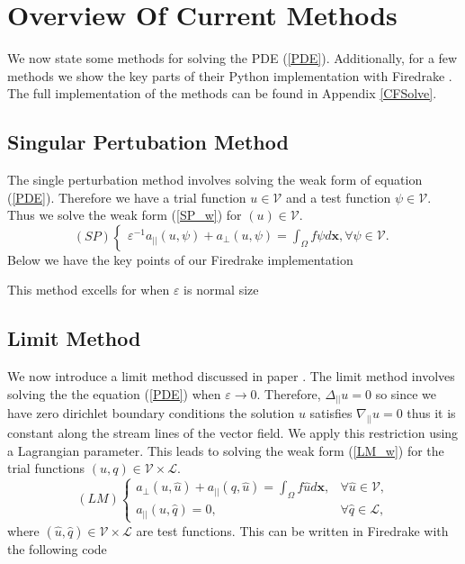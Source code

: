 \documentclass[12pt]{ociamthesis}
\begin{document}
\section{Overview Of Current Methods}
 We now state some methods for solving the PDE (\ref{PDE}). Additionally, for a few methods we show the key parts of their Python implementation with Firedrake \cite{Dragon}. The full implementation of the methods can be found in Appendix \ref{CFSolve}.
\subsection{Singular Pertubation Method} \label{SP}
The single perturbation method involves solving the weak form of equation (\ref{PDE}). Therefore we have a trial function $u \in \mathcal{V}$ and a test function $\psi \in \mathcal{V}$. Thus we solve the weak form (\ref{SP_w}) for $(u) \in \mathcal{V}$.
\begin{equation} \label{SP_w}
(SP)
\begin{cases}
\varepsilon^{-1}a_{||}(u, \psi) + a_{\perp}(u, \psi) = \int_{\Omega} f \psi d\mathbf{x}, \forall \psi \in \mathcal{V}.
\end{cases}
\end{equation}
Below we have the key points of our Firedrake \cite{Dragon} implementation

This method excells for when $\varepsilon$ is normal size

\subsection{Limit Method} \label{LM}
We now introduce a limit method discussed in paper \cite{AP}. The limit method involves solving the the equation (\ref{PDE}) when $\varepsilon \rightarrow 0$. Therefore, $\Delta_{||}u=0$ so since we have zero dirichlet boundary conditions the solution $u$ satisfies $\nabla_{||}u=0$ thus it is constant along the stream lines of the vector field. We apply this restriction using a Lagrangian parameter. This leads to solving the weak form (\ref{LM_w}) for the trial functions $(u, q) \in \mathcal{V} \times \mathcal{L}$.
\begin{equation} \label{LM_w}
(LM)
\begin{cases}
a_{\perp}(u, \hat{u}) + a_{||}(q, \hat{u}) = \int_{\Omega} f \hat{u} d\mathbf{x}, 
&\forall \hat{u} \in \mathcal{V},\\
a_{||}(u, \hat{q}) = 0, & \forall \hat{q} \in \mathcal{L},
\end{cases}
\end{equation}
where $(\hat{u}, \hat{q}) \in \mathcal{V} \times \mathcal{L}$ are test functions. This can be written in Firedrake with the following code

\end{document}
